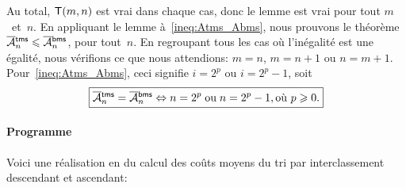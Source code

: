 Au total, \(\textsf{T}({m,n})\) est vrai dans chaque cas, donc le lemme
est vrai pour tout \(m\)~et~\(n\). En appliquant le lemme
à~\eqref{ineq:Atms_Abms}, nous prouvons le théorème
\(\OM{\fun{tms}}{n} \leqslant \OM{\fun{bms}}{n}\), pour tout~\(n\). En
regroupant tous les cas où l'inégalité est une égalité, nous vérifions
ce que nous attendions: \(m=n\), \(m=n+1\) ou
\(n=m+1\). Pour~\eqref{ineq:Atms_Abms}, ceci signifie \(i=2^p\) ou
\(i=2^p-1\), soit
\begin{equation*}
  \boxed{\OM{\fun{tms}}{n} = \OM{\fun{bms}}{n} \Leftrightarrow n=2^p
    \;\text{ou}\; n=2^p-1, \text{où \(p \geqslant 0\)}.}
\end{equation*}

\paragraph{Programme}

Voici une réalisation en \Erlang du calcul des coûts moyens du tri par
interclassement descendant et ascendant:


